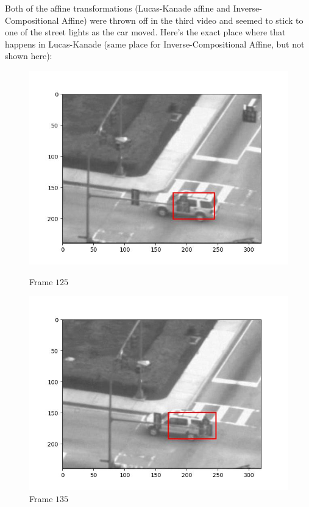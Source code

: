 Both of the affine transformations (Lucas-Kanade affine and Inverse-Compositional Affine)
were thrown off in the third video and seemed to stick to one of the street lights
as the car moved.
Here's the exact place where that happens in Lucas-Kanade
(same place for Inverse-Compositional Affine, but not shown here):

\begin{figure}[H]
  \centering
  \begin{minipage}{.45\textwidth}
    \centering
    \includegraphics[width=.8\textwidth]{./figures/lk_affine/car2/frame000125.jpg}
    \caption{Frame $125$}
  \end{minipage}
  \hfill
  \begin{minipage}{.45\textwidth}
    \centering
    \includegraphics[width=.8\textwidth]{./figures/lk_affine/car2/frame000135.jpg}
    \caption{Frame $135$}
  \end{minipage}
  \hfill
  \begin{minipage}{.45\textwidth}
    \centering

\end{minipage}
\end{figure}
